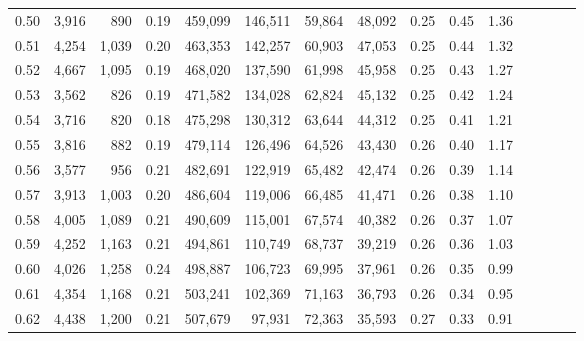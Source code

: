 \begin{tabular}{rrrcrrrrrrrrrrr}
0.50 &   3,916 &    890 &                                       0.19 &  459,099 &  146,511 &   59,864 &   48,092 &  0.25 &  0.45 &                         1.36 \\
0.51 &   4,254 &  1,039 &                                       0.20 &  463,353 &  142,257 &   60,903 &   47,053 &  0.25 &  0.44 &                         1.32 \\
0.52 &   4,667 &  1,095 &                                       0.19 &  468,020 &  137,590 &   61,998 &   45,958 &  0.25 &  0.43 &                         1.27 \\
0.53 &   3,562 &    826 &                                       0.19 &  471,582 &  134,028 &   62,824 &   45,132 &  0.25 &  0.42 &                         1.24 \\
0.54 &   3,716 &    820 &                                       0.18 &  475,298 &  130,312 &   63,644 &   44,312 &  0.25 &  0.41 &                         1.21 \\
0.55 &   3,816 &    882 &                                       0.19 &  479,114 &  126,496 &   64,526 &   43,430 &  0.26 &  0.40 &                         1.17 \\
0.56 &   3,577 &    956 &                                       0.21 &  482,691 &  122,919 &   65,482 &   42,474 &  0.26 &  0.39 &                         1.14 \\
0.57 &   3,913 &  1,003 &                                       0.20 &  486,604 &  119,006 &   66,485 &   41,471 &  0.26 &  0.38 &                         1.10 \\
0.58 &   4,005 &  1,089 &                                       0.21 &  490,609 &  115,001 &   67,574 &   40,382 &  0.26 &  0.37 &                         1.07 \\
0.59 &   4,252 &  1,163 &                                       0.21 &  494,861 &  110,749 &   68,737 &   39,219 &  0.26 &  0.36 &                         1.03 \\
0.60 &   4,026 &  1,258 &                                       0.24 &  498,887 &  106,723 &   69,995 &   37,961 &  0.26 &  0.35 &                         0.99 \\
0.61 &   4,354 &  1,168 &                                       0.21 &  503,241 &  102,369 &   71,163 &   36,793 &  0.26 &  0.34 &                         0.95 \\
0.62 &   4,438 &  1,200 &                                       0.21 &  507,679 &   97,931 &   72,363 &   35,593 &  0.27 &  0.33 &                         0.91 \\

\end{tabular}
